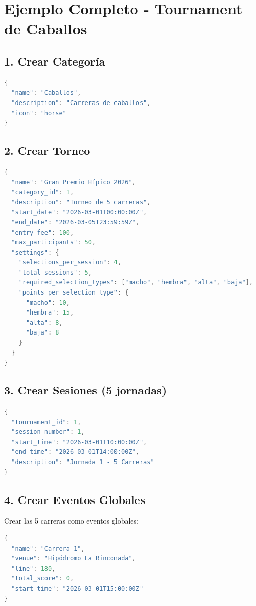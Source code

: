 \documentclass[12pt,a4paper]{article}
\begin{document}
\newpage

\section{Ejemplo Completo - Tournament de Caballos}

\subsection{1. Crear Categoría}
\begin{lstlisting}[language=c]
{
  "name": "Caballos",
  "description": "Carreras de caballos",
  "icon": "horse"
}
\end{lstlisting}

\subsection{2. Crear Torneo}
\begin{lstlisting}[language=c]
{
  "name": "Gran Premio Hípico 2026",
  "category_id": 1,
  "description": "Torneo de 5 carreras",
  "start_date": "2026-03-01T00:00:00Z",
  "end_date": "2026-03-05T23:59:59Z",
  "entry_fee": 100,
  "max_participants": 50,
  "settings": {
    "selections_per_session": 4,
    "total_sessions": 5,
    "required_selection_types": ["macho", "hembra", "alta", "baja"],
    "points_per_selection_type": {
      "macho": 10,
      "hembra": 15,
      "alta": 8,
      "baja": 8
    }
  }
}
\end{lstlisting}

\subsection{3. Crear Sesiones (5 jornadas)}
\begin{lstlisting}[language=c]
{
  "tournament_id": 1,
  "session_number": 1,
  "start_time": "2026-03-01T10:00:00Z",
  "end_time": "2026-03-01T14:00:00Z",
  "description": "Jornada 1 - 5 Carreras"
}
\end{lstlisting}

\subsection{4. Crear Eventos Globales}
Crear las 5 carreras como eventos globales:
\begin{lstlisting}[language=c]
{
  "name": "Carrera 1",
  "venue": "Hipódromo La Rinconada",
  "line": 180,
  "total_score": 0,
  "start_time": "2026-03-01T15:00:00Z"
}
\end{lstlisting}
\end{document}
